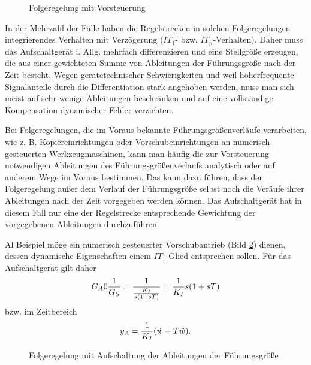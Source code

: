 \begin{figure}[ht]
    \centering
    \caption{Folgeregelung mit Vorsteuerung}
    \label{fig:7-11}
\end{figure}

In der Mehrzahl der Fälle haben die Regelstrecken in solchen Folgeregelungen integrierendes Verhalten mit Verzögerung (\(IT_1\)- bzw. \(IT_n\)-Verhalten).
Daher muss das Aufschaltgerät i. Allg. mehrfach differenzieren und eine Stellgröße erzeugen, die aus einer gewichteten Summe von Ableitungen der Führungsgröße nach der Zeit besteht.
Wegen gerätetechnischer Schwierigkeiten und weil höherfrequente Signalanteile durch die Differentiation stark angehoben werden, muss man sich meist auf sehr wenige Ableitungen beschränken und auf eine vollständige Kompensation dynamischer Fehler verzichten.

Bei Folgeregelungen, die im Voraus bekannte Führungsgrößenverläufe verarbeiten, wie z. B. Kopiereinrichtungen oder Vorschubeinrichtungen an numerisch gesteuerten Werkzeugmaschinen, kann man häufig die zur Vorsteuerung notwendigen Ableitungen des Führungsgrößenverlaufs analytisch oder auf anderem Wege im Voraus bestimmen.
Das kann dazu führen, dass der Folgeregelung außer dem Verlauf der Führungsgröße selbst noch die Veräufe ihrer Ableitungen nach der Zeit vorgegeben werden können.
Das Aufschaltgerät hat in diesem Fall nur eine der Regelstrecke entsprechende Gewichtung der vorgegebenen Ableitungen durchzuführen.

Al Beispiel möge ein numerisch gesteuerter Vorschubantrieb (Bild \ref{fig:7-12}) dienen, dessen dynamische Eigenschaften einem \(IT_1\)-Glied entsprechen sollen.
Für das Aufschaltgerät gilt daher
\begin{equation}
    G_A 0 \frac{1}{G_S} = \frac{1}{\frac{K_I}{s\parentheses*{1 + sT}}} = \frac{1}{K_I}s\parentheses*{1 + sT}
\end{equation}
bzw. im Zeitbereich
\begin{equation}
    y_A = \frac{1}{K_I}\parentheses*{\dot{w} + T\ddot{w}}.
\end{equation}

\begin{figure}[ht]
    \centering
    \caption{Folgeregelung mit Aufschaltung der Ableitungen der Führungsgröße}
    \label{fig:7-12}
\end{figure}

